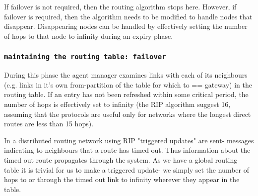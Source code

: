 \documentclass{cmspaper}
\begin{document}
If failover is not required, then the routing algorithm stops here.
However, if failover is required, then the algorithm needs to be
modified to handle nodes that disappear.  Disappearing nodes can be
handled by effectively setting the number of hops to that node to
infinity during an expiry phase.

\subsubsection{\textbf{\texttt{maintaining the routing table: failover}}}
During this phase the agent manager examines links with each of its
neighbours (e.g. links in it's own from-partition of the table for
which to == gateway) in the routing table.  If an entry has not been
refreshed within some critical period, the number of hops is
effectively set to infinity (the RIP algorithm suggest 16, assuming
that the protocols are useful only for networks where the longest
direct routes are less than 15 hops).

In a distributed routing network using RIP "triggered updates" are sent-
messages indicating to neighbours that a route has timed out. Thus
information about the timed out route propagates through the system. As
we have a global routing table it is trivial for us to make a triggered
update- we simply set the number of hops to or through the timed out
link to infinity wherever they appear in the table.
\end{document}
